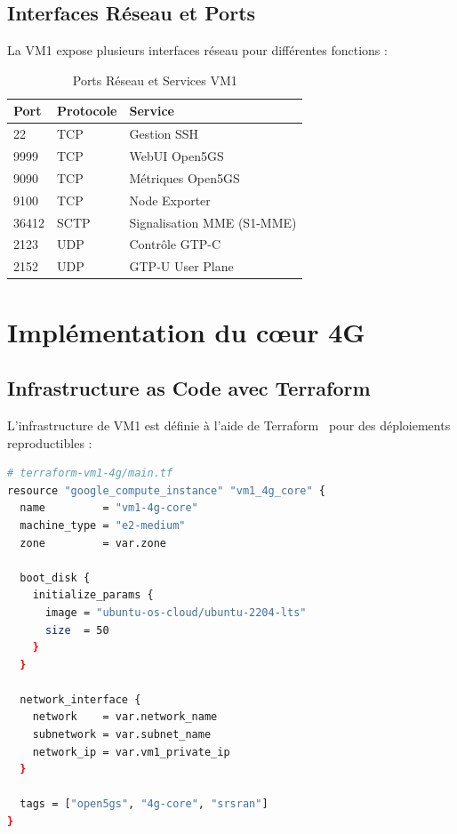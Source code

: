 \documentclass[12pt,a4paper]{report}
\begin{document}
\subsection{Interfaces Réseau et Ports}

La VM1 expose plusieurs interfaces réseau pour différentes fonctions :

\begin{table}[H]
\centering
\caption{Ports Réseau et Services VM1}
\label{tab:vm1-ports}
\begin{tabular}{@{}lll@{}}
\toprule
Port & Protocole & Service \\
\midrule
22 & TCP & Gestion SSH \\
9999 & TCP & WebUI Open5GS \\
9090 & TCP & Métriques Open5GS \\
9100 & TCP & Node Exporter \\
36412 & SCTP & Signalisation MME (S1-MME) \\
2123 & UDP & Contrôle GTP-C \\
2152 & UDP & GTP-U User Plane \\
\bottomrule
\end{tabular}
\end{table}


\section{Implémentation du cœur 4G}

\subsection{Infrastructure as Code avec Terraform}

L'infrastructure de VM1 est définie à l'aide de Terraform~\cite{terraform-docs} pour des déploiements reproductibles :

\begin{lstlisting}[caption=Configuration Terraform VM1, language=bash]
# terraform-vm1-4g/main.tf
resource "google_compute_instance" "vm1_4g_core" {
  name         = "vm1-4g-core"
  machine_type = "e2-medium"
  zone         = var.zone

  boot_disk {
    initialize_params {
      image = "ubuntu-os-cloud/ubuntu-2204-lts"
      size  = 50
    }
  }

  network_interface {
    network    = var.network_name
    subnetwork = var.subnet_name
    network_ip = var.vm1_private_ip
  }

  tags = ["open5gs", "4g-core", "srsran"]
}
\end{lstlisting}
\end{document}
